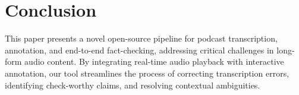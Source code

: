 \section{Conclusion}

This paper presents a novel open-source pipeline for podcast transcription, annotation, and end-to-end fact-checking, addressing critical challenges in long-form audio content. By integrating real-time audio playback with interactive annotation, our tool streamlines the process of correcting transcription errors, identifying check-worthy claims, and resolving contextual ambiguities.

